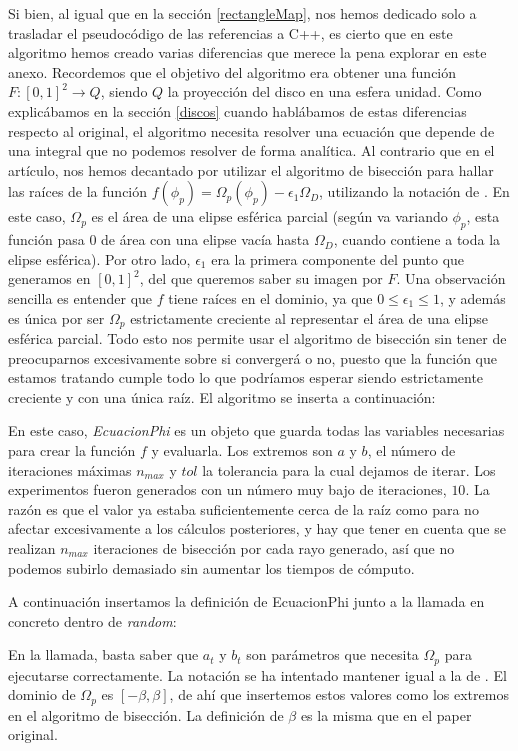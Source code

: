 \documentclass{scrbook}
\begin{document}
Si bien, al igual que en la sección \ref{rectangleMap}, nos hemos dedicado solo a trasladar el pseudocódigo de las referencias a C++, es cierto que en este algoritmo hemos creado varias diferencias que merece la pena explorar en este anexo. Recordemos que el objetivo del algoritmo era obtener una función $F:[0,1]^2\rightarrow Q$, siendo $Q$ la proyección del disco en una esfera unidad. Como explicábamos en la sección \ref{discos} cuando hablábamos de estas diferencias respecto al original, el algoritmo necesita resolver una ecuación que depende de una integral que no podemos resolver de forma analítica. Al contrario que en el artículo, nos hemos decantado por utilizar el algoritmo de bisección para hallar las raíces de la función $f(\phi_p) = \Omega_p(\phi_p)-\epsilon_1\Omega_D$, utilizando la notación de \cite[Equation~13]{ur2017}. En este caso, $\Omega_p$ es el área de una elipse esférica parcial (según va variando $\phi_p$, esta función pasa $0$ de área con una elipse vacía hasta $\Omega_D$, cuando contiene a toda la elipse esférica). Por otro lado, $\epsilon_1$ era la primera componente del punto que generamos en $[0,1]^2$, del que queremos saber su imagen por $F$. Una observación sencilla es entender que $f$ tiene raíces en el dominio, ya que $0 \leq \epsilon_1 \leq 1$, y además es única por ser $\Omega_p$ estrictamente creciente al representar el área de una elipse esférica parcial.  Todo esto nos permite usar el algoritmo de bisección sin tener de preocuparnos excesivamente sobre si convergerá o no, puesto que la función que estamos tratando cumple todo lo que podríamos esperar siendo estrictamente creciente y con una única raíz. El algoritmo se inserta a continuación:

En este caso, \textit{EcuacionPhi} es un objeto que guarda todas las variables necesarias para crear la función $f$ y evaluarla. Los extremos son $a$ y $b$, el número de iteraciones máximas $n_{max}$ y $tol$ la tolerancia para la cual dejamos de iterar. Los experimentos fueron generados con un número muy bajo de iteraciones, $10$. La razón es que el valor ya estaba suficientemente cerca de la raíz como para no afectar excesivamente a los cálculos posteriores, y hay que tener en cuenta que se realizan $n_{max}$ iteraciones de bisección por cada rayo generado, así que no podemos subirlo demasiado sin aumentar los tiempos de cómputo. 

A continuación insertamos la definición de EcuacionPhi junto a la llamada en concreto dentro de \textit{random}:

En la llamada, basta saber que $a_t$ y $b_t$ son parámetros que necesita $\Omega_p$ para ejecutarse correctamente. La notación se ha intentado mantener igual a la de \cite{ur2017}. El dominio de $\Omega_p$ es $[-\beta, \beta]$, de ahí que insertemos estos valores como los extremos en el algoritmo de bisección. La definición de $\beta$ es la misma que en el paper original.

\end{document}
